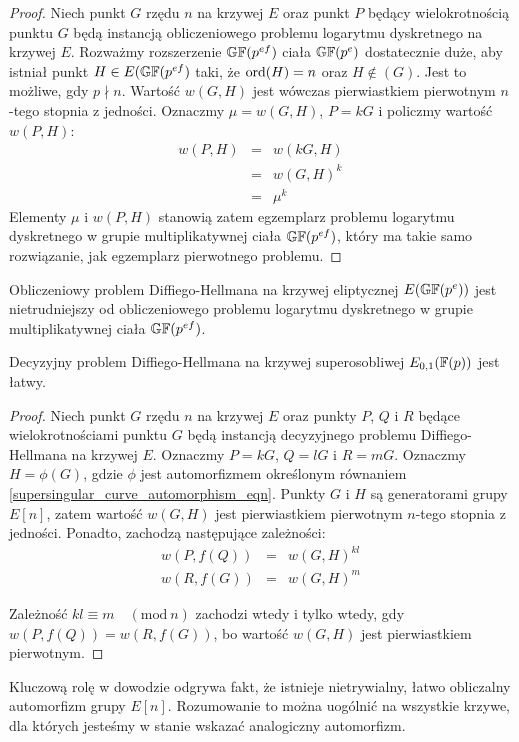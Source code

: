 \begin{proof}
Niech punkt $G$ rzędu $n$ na krzywej $E$
oraz punkt $P$ będący wielokrotnością punktu $G$
będą instancją obliczeniowego problemu logarytmu dyskretnego na krzywej $E$.
Rozważmy rozszerzenie $\mathbb{GF}(p^{ef})$ ciała $\mathbb{GF}(p^e)$ dostatecznie duże,
aby istniał punkt $H \in E(\mathbb{GF}(p^{ef})$ taki,
że $\operatorname{ord}(H) = n$ oraz $H \notin (G)$.
Jest to możliwe, gdy $p \nmid n$.
Wartość $w(G, H)$ jest wówczas
pierwiastkiem pierwotnym $n$-tego stopnia z jedności.
Oznaczmy $\mu = w(G, H)$, $P = kG$ i policzmy wartość $w(P, H)$:
\begin{eqnarray*}
w(P, H)
& = & w(kG, H) \\
& = & w(G, H)^k \\
& = & \mu^k
\end{eqnarray*}
Elementy $\mu$ i $w(P, H)$ stanowią zatem
egzemplarz problemu logarytmu dyskretnego
w grupie multiplikatywnej ciała $\mathbb{GF}(p^{ef})$,
który ma takie samo rozwiązanie, jak egzemplarz pierwotnego problemu.
\end{proof}

\begin{corollary}
Obliczeniowy problem Diffiego-Hellmana na krzywej eliptycznej $E(\mathbb{GF}(p^e))$
jest nietrudniejszy od obliczeniowego problemu logarytmu dyskretnego
w grupie multiplikatywnej ciała $\mathbb{GF}(p^{ef})$.
\end{corollary}

\begin{theorem}
Decyzyjny problem Diffiego-Hellmana
na krzywej superosobliwej \linebreak $E_{0,1}(\mathbb{F}(p))$
jest łatwy.
\end{theorem}

\begin{proof}
Niech punkt $G$ rzędu $n$ na krzywej $E$
oraz punkty $P$, $Q$ i $R$ będące wielokrotnościami punktu $G$
będą instancją decyzyjnego problemu Diffiego-Hellmana na krzywej $E$.
Oznaczmy $P = kG$, $Q = lG$ i $R = mG$.
Oznaczmy $H = \phi(G)$,
gdzie $\phi$ jest automorfizmem określonym
równaniem \ref{supersingular_curve_automorphism_eqn}.
Punkty $G$ i $H$ są generatorami grupy $E[n]$,
zatem wartość $w(G, H)$
jest pierwiastkiem pierwotnym $n$-tego stopnia z jedności.
Ponadto, zachodzą następujące zależności:
\begin{eqnarray*}
w(P, f(Q)) & = & w(G, H)^{kl} \\
w(R, f(G)) & = & w(G, H)^m
\end{eqnarray*}

\noindent
Zależność $kl \equiv m \quad (\mathrm{mod}\ n)$
zachodzi wtedy i tylko wtedy,
gdy $w(P, f(Q)) = w(R, f(G))$,
bo wartość $w(G, H)$ jest pierwiastkiem pierwotnym.
\end{proof}

\begin{remark}
Kluczową rolę w dowodzie odgrywa fakt,
że istnieje nietrywialny, łatwo obliczalny automorfizm grupy $E[n]$.
Rozumowanie to można uogólnić na wszystkie krzywe,
dla których jesteśmy w stanie wskazać analogiczny automorfizm.
\end{remark}
